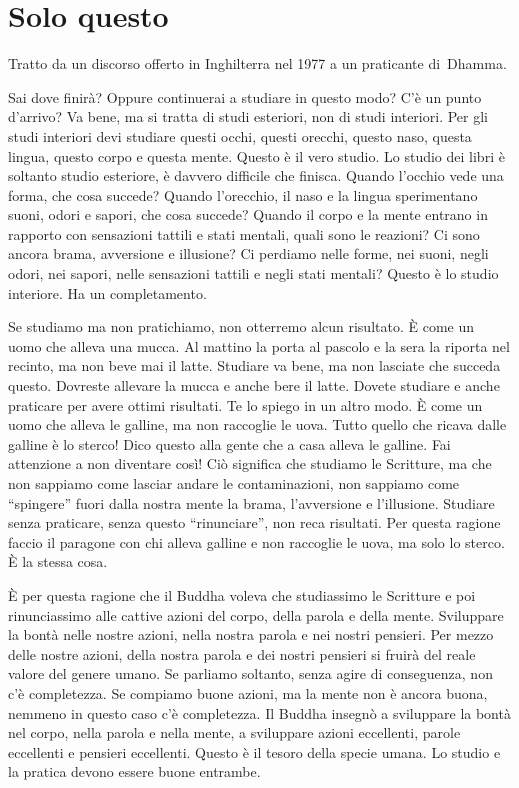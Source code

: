\chapter{Solo questo}

\begin{openingQuote}
  \centering

  Tratto da un discorso offerto in Inghilterra nel 1977 a un praticante
  di~Dhamma.
\end{openingQuote}

Sai dove finirà? Oppure continuerai a studiare in questo modo? C'è un
punto d'arrivo? Va bene, ma si tratta di studi esteriori, non di studi
interiori. Per gli studi interiori devi studiare questi occhi, questi
orecchi, questo naso, questa lingua, questo corpo e questa mente. Questo
è il vero studio. Lo studio dei libri è soltanto studio esteriore, è
davvero difficile che finisca. Quando l'occhio vede una forma, che cosa
succede? Quando l'orecchio, il naso e la lingua sperimentano suoni,
odori e sapori, che cosa succede? Quando il corpo e la mente entrano in
rapporto con sensazioni tattili e stati mentali, quali sono le reazioni?
Ci sono ancora brama, avversione e illusione? Ci perdiamo nelle forme,
nei suoni, negli odori, nei sapori, nelle sensazioni tattili e negli
stati mentali? Questo è lo studio interiore. Ha un completamento.

Se studiamo ma non pratichiamo, non otterremo alcun risultato. È come un
uomo che alleva una mucca. Al mattino la porta al pascolo e la sera la
riporta nel recinto, ma non beve mai il latte. Studiare va bene, ma non
lasciate che succeda questo. Dovreste allevare la mucca e anche bere il
latte. Dovete studiare e anche praticare per avere ottimi risultati. Te
lo spiego in un altro modo. È come un uomo che alleva le galline, ma non
raccoglie le uova. Tutto quello che ricava dalle galline è lo sterco!
Dico questo alla gente che a casa alleva le galline. Fai attenzione a
non diventare così! Ciò significa che studiamo le Scritture, ma che non
sappiamo come lasciar andare le contaminazioni, non sappiamo come
``spingere'' fuori dalla nostra mente la brama, l'avversione e
l'illusione. Studiare senza praticare, senza questo ``rinunciare'', non
reca risultati. Per questa ragione faccio il paragone con chi alleva
galline e non raccoglie le uova, ma solo lo sterco. È la stessa cosa.

È per questa ragione che il Buddha voleva che studiassimo le Scritture e
poi rinunciassimo alle cattive azioni del corpo, della parola e della
mente. Sviluppare la bontà nelle nostre azioni, nella nostra parola e
nei nostri pensieri. Per mezzo delle nostre azioni, della nostra parola
e dei nostri pensieri si fruirà del reale valore del genere umano. Se
parliamo soltanto, senza agire di conseguenza, non c'è completezza. Se
compiamo buone azioni, ma la mente non è ancora buona, nemmeno in questo
caso c'è completezza. Il Buddha insegnò a sviluppare la bontà nel corpo,
nella parola e nella mente, a sviluppare azioni eccellenti, parole
eccellenti e pensieri eccellenti. Questo è il tesoro della specie umana.
Lo studio e la pratica devono essere buone entrambe.

